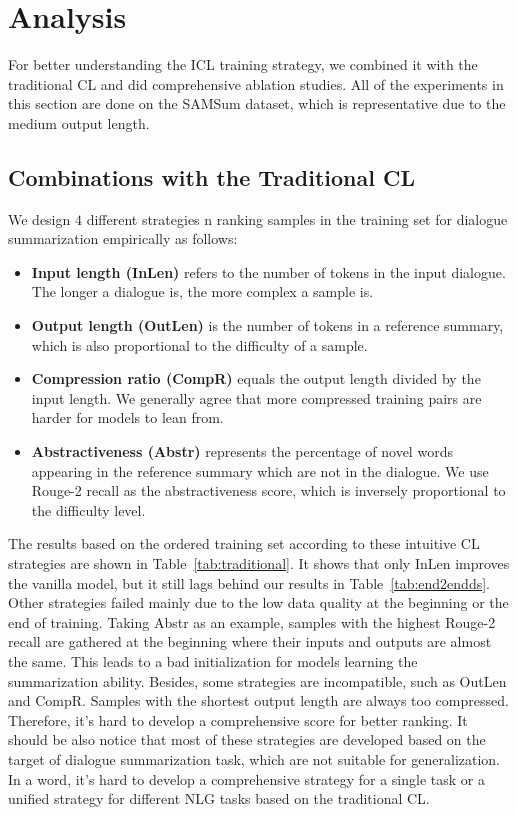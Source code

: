 \section{Analysis}

For better understanding the ICL training strategy, 
we combined it with the traditional CL and did comprehensive ablation studies. All of the experiments in this section are done on the SAMSum dataset, which is representative due to the medium output length.

\subsection{Combinations with the Traditional CL}

We design $4$ different strategies n ranking samples in the training set for dialogue summarization empirically as follows:
\begin{itemize}
	\item \textbf{Input length (InLen)} refers to the number of tokens in the input dialogue. The longer a dialogue is, the more complex a sample is.
	\item \textbf{Output length (OutLen)} is the number of tokens in a reference summary, which is also proportional to the difficulty of a sample.
	\item \textbf{Compression ratio (CompR)} equals the output length divided by the input length. We generally agree that more compressed training pairs are harder for models to lean from.
	\item \textbf{Abstractiveness (Abstr)} represents the percentage of novel words appearing in the reference summary which are not in the dialogue. We use Rouge-2 recall as the abstractiveness score, which is inversely proportional to the difficulty level.
\end{itemize}

The results based on the ordered training set according to these intuitive CL strategies are shown in Table~\ref{tab:traditional}. It shows that only InLen improves the vanilla model, but it still lags behind our results in Table~\ref{tab:end2endds}. Other strategies failed mainly due to the low data quality at the beginning or the end of training. 
Taking Abstr as an example, samples with the highest 
Rouge-2 recall are gathered at the beginning where 
their inputs and outputs are almost the same. 
This leads to a bad initialization for models learning 
the summarization ability. Besides, some strategies 
are incompatible, such as OutLen and CompR. Samples with the shortest output length are always too compressed. Therefore, it's hard to develop a comprehensive score for better ranking. It should be also notice that most of these strategies are developed based on the target of dialogue summarization task, which are not suitable for generalization. In a word, it's hard to develop a 
comprehensive strategy for a single task or a unified strategy for different NLG tasks based on the traditional CL. 


